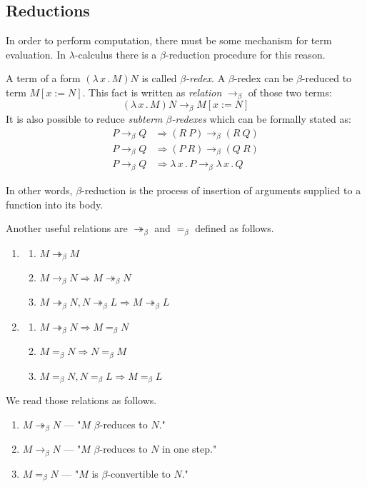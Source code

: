 \documentclass{sig-alternate}
\newcommand{\then}{\Rightarrow\xspace}
\newcommand{\lamb}[2]{( \lambda \, #1 \, . \, #2 )}
\newcommand{\lam}[2]{\lambda \, #1 \, . \, #2}
\newcommand{\bbarr}{\twoheadrightarrow_\beta}
\newcommand{\barr}{\rightarrow_\beta}
\newcommand{\beq}{=_\beta}
\newcommand{\bRedex}{$\beta$-redex\xspace}
\newcommand{\bRedexes}{$\beta$-redexes\xspace}
\newcommand{\bArrow}{\rightarrow_\beta\xspace}
\begin{document}
\subsection{Reductions}

In order to perform computation, there must be some
mechanism for term evaluation. In $\lambda$-calculus there
is a \mbox{$\beta$-reduction} procedure for this reason.

A term of a form $\lamb{x}{M}N$ is called \textit{\bRedex}.
A \bRedex can be $\beta$-reduced to term $M[x:=N]$. 
This fact is written as \textit{relation} $\bArrow$ 
of those two terms:
\begin{equation} \label{eq:bRed}
\lamb{x}{M}N \bArrow M[x:=N]
\end{equation}
It is also possible to reduce \textit{subterm \bRedexes} 
which can be formally stated as:
\begin{align*}
P \bArrow Q &\then (R~P)      \bArrow (R~Q) \\
P \bArrow Q &\then (P~R)      \bArrow (Q~R) \\
P \bArrow Q &\then \lam{x}{P} \bArrow \lam{x}{Q}  
\end{align*}

In other words, $\beta$-reduction is the process 
of insertion of arguments supplied to a function into 
its body.

Another useful relations are $\bbarr$ and $\beq$ defined as follows. 

\begin{enumerate}
 \item \begin{enumerate}
 	\item $M \bbarr M$
 	\item $M \barr N \then M \bbarr N$
 	\item $M \bbarr N , N \bbarr L \then M \bbarr L$ 	
 \end{enumerate}
 \item \begin{enumerate}
 	\item $M \bbarr N \then M \beq N$
 	\item $M \beq N \then N \beq M$
 	\item $M \beq N , N \beq L \then M \beq L$
 \end{enumerate}

\end{enumerate}

We read those relations as follows.
\begin{enumerate}
 	\item $M \bbarr N$ --- "$M$ $\beta$-reduces to $N$."  
 	\item $M \barr N$  --- "$M$ $\beta$-reduces to $N$
 	      in one step."
 	\item $M \beq N$ --- "$M$ is $\beta$-convertible to $N$."	
 \end{enumerate}
\end{document}
